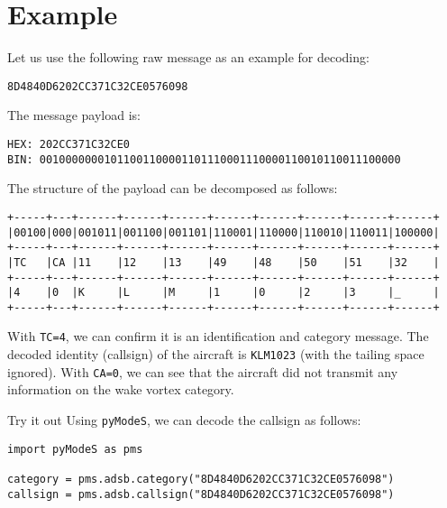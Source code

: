 \section{Example}

Let us use the following raw message as an example for decoding:

\begin{verbatim}
8D4840D6202CC371C32CE0576098
\end{verbatim}

The message payload is:

\begin{verbatim}
HEX: 202CC371C32CE0
BIN: 00100000001011001100001101110001110000110010110011100000
\end{verbatim}

The structure of the payload can be decomposed as follows:

\begin{verbatim}
+-----+---+------+------+------+------+------+------+------+------+
|00100|000|001011|001100|001101|110001|110000|110010|110011|100000|
+-----+---+------+------+------+------+------+------+------+------+
|TC   |CA |11    |12    |13    |49    |48    |50    |51    |32    |
+-----+---+------+------+------+------+------+------+------+------+
|4    |0  |K     |L     |M     |1     |0     |2     |3     |_     |
+-----+---+------+------+------+------+------+------+------+------+
\end{verbatim}

With \texttt{TC=4}, we can confirm it is an identification and category message. The decoded identity (callsign) of the aircraft is \texttt{KLM1023} (with the tailing space ignored). With \texttt{CA=0}, we can see that the aircraft did not transmit any information on the wake vortex category.

\begin{notebox}{Try it out}
Using \texttt{pyModeS}, we can decode the callsign as follows:

\begin{verbatim}
import pyModeS as pms

category = pms.adsb.category("8D4840D6202CC371C32CE0576098")
callsign = pms.adsb.callsign("8D4840D6202CC371C32CE0576098")
\end{verbatim}

\end{notebox}
 
  
